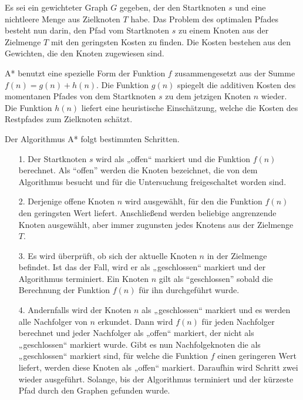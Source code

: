 Es sei ein gewichteter Graph $G$ gegeben, der den Startknoten $s$ und eine nichtleere Menge aus Zielknoten $T$ habe. Das Problem des optimalen Pfades besteht nun darin, den Pfad vom Startknoten $s$ zu einem Knoten aus der Zielmenge $T$ mit den geringsten Kosten zu finden. %
Die Kosten bestehen aus den Gewichten, die den Knoten zugewiesen sind\cite{RinaDechterandJudeaPearl.1983}.

A* benutzt eine spezielle Form der Funktion $f$ zusammengesetzt aus der Summe $f(n) = g(n) + h(n)$.
Die Funktion $g(n)$ spiegelt die additiven Kosten des momentanen Pfades von dem Startknoten $s$ zu dem jetzigen Knoten $n$ wieder.
Die Funktion $h(n)$ liefert eine heuristische Einschätzung, welche die Kosten des Restpfades zum Zielknoten schätzt\cite{RinaDechterandJudeaPearl.1983}. %


Der Algorithmus A* folgt bestimmten Schritten.
\begin{itemize}
\item[1.] Der Startknoten $s$ wird als „offen“ markiert und die Funktion $f(n)$ berechnet. Als “offen” werden die Knoten bezeichnet, die von dem Algorithmus besucht und für die Untersuchung freigeschaltet worden sind.
\item[2.] Derjenige offene Knoten $n$ wird ausgewählt, für den die Funktion $f(n)$
den geringsten Wert liefert. Anschließend werden beliebige angrenzende Knoten ausgewählt, aber immer zugunsten jedes Knotens aus der Zielmenge $T$.
\item[3.] Es wird überprüft, ob sich der aktuelle Knoten $n$ in der Zielmenge befindet. Ist das der Fall, wird er als „geschlossen“ markiert und der Algorithmus terminiert. Ein Knoten $n$ gilt als “geschlossen” sobald die Berechnung der Funktion $f(n)$ für ihn durchgeführt wurde.
\item[4.]
Andernfalls wird der Knoten $n$ als „geschlossen“ markiert und es werden alle Nachfolger von $n$ erkundet. Dann wird $f(n)$ für jeden Nachfolger berechnet und jeder Nachfolger als „offen“ markiert, der nicht als „geschlossen“ markiert wurde. Gibt es nun Nachfolgeknoten die als „geschlossen“ markiert sind, für welche die Funktion $f$ einen geringeren Wert liefert, werden diese Knoten als „offen“ markiert. Daraufhin wird Schritt zwei wieder ausgeführt. Solange, bis der Algorithmus terminiert und der kürzeste Pfad durch den Graphen gefunden wurde\cite{HartNilssonandRaphael.1968}.
\end{itemize}
